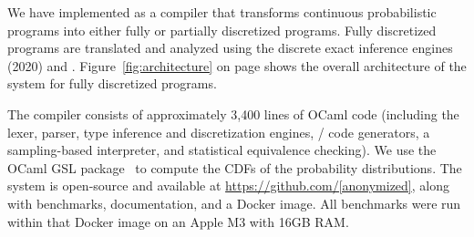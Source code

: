
We have implemented \Slice{} as a compiler that transforms continuous probabilistic programs into either fully or partially discretized programs. Fully discretized programs are translated and analyzed using the discrete exact inference engines \Dice{} (2020) and \Roulette{}. Figure~\ref{fig:architecture} on page \pageref{fig:architecture} shows the overall architecture of the \Slice{} system for fully discretized programs.

The \Slice{} compiler consists of approximately 3,400 lines of OCaml code (including the lexer, parser, type inference and discretization engines, \Dice{}/\Roulette{} code generators, a sampling-based interpreter, and statistical equivalence checking). We use the OCaml GSL package~\cite{gsl} to compute the CDFs of the probability distributions. The system is open-source and available at \url{https://github.com/[anonymized]}, along with benchmarks, documentation, and a Docker image. All benchmarks were run within that Docker image on an Apple M3 with 16GB RAM.

%



